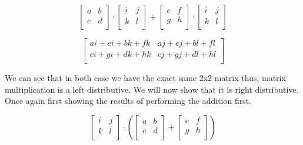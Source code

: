 \documentclass{article}
\begin{document}
        \[
            \left[ {\begin{array}{cc}
                a & b \\
                c & d \\
            \end{array} } \right]
            \cdot
            \left[ {\begin{array}{cc}
                i & j \\
                k & l \\
            \end{array} } \right]
            +
            \left[ {\begin{array}{cc}
                e & f \\
                g & h \\
            \end{array} } \right]
            \cdot
            \left[ {\begin{array}{cc}
                i & j \\
                k & l \\
            \end{array} } \right]
        \]

        \[
            \left[ {\begin{array}{cc}
                ai+ei + bk+fk & aj+ej + bl+fl\\
                ci+gi + dk+hk & cj+gj+dl+hl \\
            \end{array} } \right]
        \]

        We can see that in both case we have the exact same 2x2 matrix thus, matrix multiplication is a left distributive. We will now show that it is right distributive. Once again first showing the results of performing the addition first.

        \[
            \left[ {\begin{array}{cc}
            i & j \\
            k & l \\
            \end{array} } \right]
            \cdot
            \left(
            \left[ {\begin{array}{cc}
                a & b \\
                c & d \\
            \end{array} } \right]
            +
            \left[ {\begin{array}{cc}
                e & f \\
                g & h \\
            \end{array} } \right]
            \right)
        \]
\end{document}
